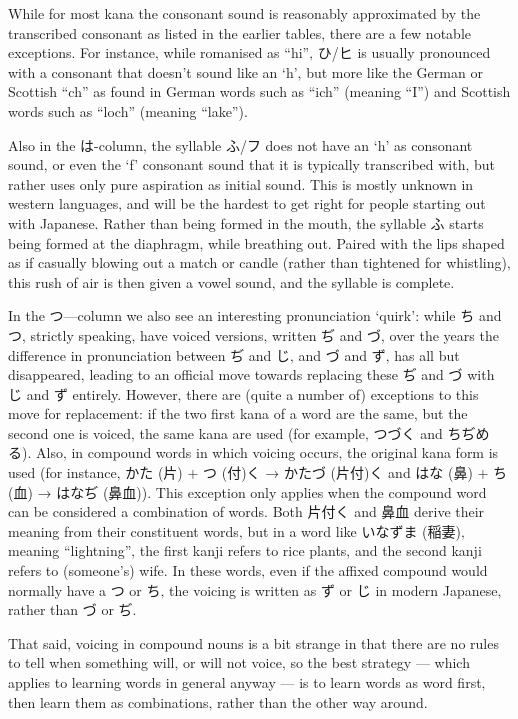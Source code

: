 \documentclass[11pt, b5paper, twoside, openright, onecolumn]{book}
\makeatletter
\newcommand*{\rubystack}[2]{{\relscale{0.5}%
  \begin{tabular}[b]{@{}c@{}}%
    {#1}\\%
   {\textscale{2}{#2}}%
  \end{tabular}}%
}
\DeclareRobustCommand*{\ruby}[2]{%
  \mbox{%
    \setlength{\parskip}{0ex}%
    \BeginAccSupp{method=pdfstringdef,ActualText={#1}}%
      \rubystack{\phantom{#2}}{#1}%
      \llap{%
        \rubystack{#2}{\phantom{#1}}%
      }%
    \EndAccSupp{}%
  }%
}
\renewcommand*{\ruby}[2]{#2 (#1)}%
\makeatother
\begin{document}
While for most kana the consonant sound is reasonably approximated by the transcribed consonant as listed in the earlier tables‚ there are a few notable exceptions. For instance‚ while romanised as “hi”‚ ひ/ヒ is usually pronounced with a consonant that doesn’t sound like an ‘h’‚ but more like the German or Scottish “ch” as found in German words such as “ich” (meaning “I”) and Scottish words such as “loch” (meaning “lake”).

Also in the は-column‚ the syllable ふ/フ does not have an ‘h’ as consonant sound‚ or even the ‘f’ consonant sound that it is typically transcribed with‚ but rather uses only pure aspiration as initial sound. This is mostly unknown in western languages‚ and will be the hardest to get right for people starting out with Japanese. Rather than being formed in the mouth‚ the syllable ふ starts being formed at the diaphragm‚ while breathing out. Paired with the lips shaped as if casually blowing out a match or candle (rather than tightened for whistling)‚ this rush of air is then given a vowel sound‚ and the syllable is complete.

In the つ—column we also see an interesting pronunciation ‘quirk’: while ち and つ‚ strictly speaking‚ have voiced versions‚ written ぢ and づ‚ over the years the difference in pronunciation between ぢ and じ‚ and づ and ず‚ has all but disappeared‚ leading to an official move towards replacing these ぢ and づ with じ and ず entirely. However‚ there are (quite a number of) exceptions to this move for replacement: if the two first kana of a word are the same‚ but the second one is voiced‚ the same kana are used (for example‚ つづく and ちぢめる). Also‚ in compound words in which voicing occurs‚ the original kana form is used (for instance‚ \ruby{片}{かた} + \ruby{付}{つ}く → \ruby{片付}{かたづ}く and \ruby{鼻}{はな} + \ruby{血}{ち} → \ruby{鼻血}{はなぢ}). This exception only applies when the compound word can be considered a combination of words. Both 片付く and 鼻血 derive their meaning from their constituent words‚ but in a word like \ruby{稲妻}{いなずま}‚ meaning “lightning”‚ the first kanji refers to rice plants‚ and the second kanji refers to (someone’s) wife. In these words‚ even if the affixed compound would normally have a つ or ち‚ the voicing is written as ず or じ in modern Japanese‚ rather than づ or ぢ.

That said‚ voicing in compound nouns is a bit strange in that there are no rules to tell when something will‚ or will not voice‚ so the best strategy — which applies to learning words in general anyway — is to learn words as word first‚ then learn them as combinations‚ rather than the other way around.
\end{document}
